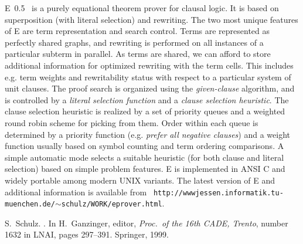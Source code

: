 \documentclass{article}
\begin{document}
E~0.5~\cite{Schulz:CADE-99} is a purely equational theorem prover for
clausal logic. It is based on superposition (with literal selection)
and rewriting. The two most unique features of E are term
representation and search control. Terms are represented as perfectly
shared graphs, and rewriting is performed on all instances of a
particular subterm in parallel. As terms are shared, we can afford to
store additional information for optimized rewriting with the term
cells. This includes e.g. term weights and rewritability status with
respect to a particular system of unit clauses. The proof search is
organized using the \emph{given-clause} algorithm, and is controlled
by a \emph{literal selection function} and a \emph{clause selection
  heuristic}. The clause selection heuristic is realized by a set of
priority queues and a weighted round robin scheme for picking from
them. Order within each queue is determined by a priority function
(e.g. \emph{prefer all negative clauses}) and a weight function
usually based on symbol counting and term ordering comparisons. A
simple automatic mode selects a suitable heuristic (for both clause
and literal selection) based on simple problem features. E is
implemented in ANSI C and widely portable among modern UNIX variants.
The latest version of E and additional information is available from
{\tt \small
  http://wwwjessen.informatik.tu-muenchen.de/$\sim$schulz/WORK/eprover.html}.

%
\begin{thebibliography}{Sch99}

S.~Schulz.
.
\newblock In H.~Ganzinger, editor, {\em Proc.\ of the 16th CADE, Trento},
  number 1632 in LNAI, pages 297--391. Springer, 1999.

\end{thebibliography}
\end{document}
